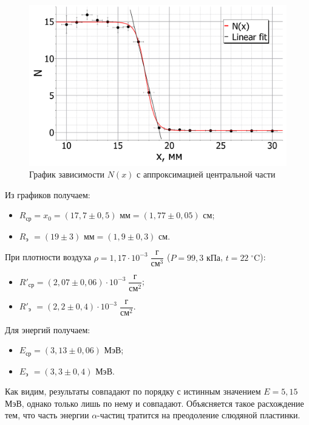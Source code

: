 \begin{enumerate}
		\begin{figure}[h!]
			\centering
			\includegraphics[width=0.98\linewidth]{Pictures/Geiger_PlotFit.pdf}
			\caption{График зависимости $N(x)$ с аппроксимацией центральной части}
		\end{figure}
		
		
		
		Из графиков получаем:
		\begin{itemize}
			\item $R_\text{ср} = x_0 = (17,7 \pm 0,5) \text{ мм} = (1,77 \pm 0,05) \text{ см}$;
			
			
			\item $R_\text{э} \,\, = (19 \pm 3) \text{ мм} = (1,9 \pm 0,3) \text{ см}$.
		\end{itemize}
	
		При плотности воздуха $\rho = 1,17 \cdot 10^{-3} \;\dfrac{\text{г}}{\text{см}^3}$ ($P = 99,3 \text{ кПа}$, $t = 22\;^\circ \text{C}$):
		\begin{itemize}
			\item $R'_\text{ср} = (2,07 \pm 0,06) \cdot 10^{-3} \;\dfrac{\text{г}}{\text{см}^2}$;
			
			
			\item $R'_\text{э} \,\, = (2,2 \pm 0,4) \cdot 10^{-3} \;\dfrac{\text{г}}{\text{см}^2}$.
		\end{itemize}
	
		Для энергий получаем:
		\begin{itemize}
			\item $E_\text{ср} = (3,13 \pm 0,06) \text{ МэВ}$;
			
			\item $E_\text{э} \,\, = (3,3 \pm 0,4) \text{ МэВ}$.
		\end{itemize}
	
	Как видим, результаты совпадают по порядку с истинным значением $E = 5,15$ МэВ, однако только лишь по нему и совпадают. Объясняется такое расхождение тем, что часть энергии $\alpha$-частиц тратится на преодоление слюдяной пластинки.
	
	\end{enumerate}
	
